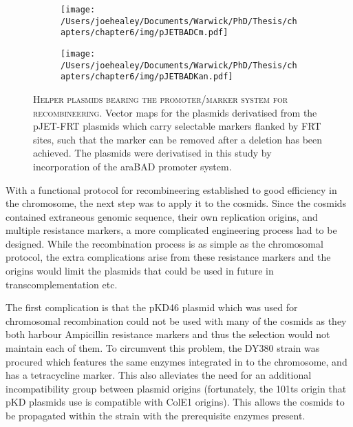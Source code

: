 \begin{figure}[p]
\centering
  \begin{subfigure}{\textwidth}
    \texttt{[image: /Users/joehealey/Documents/Warwick/PhD/Thesis/chapters/chapter6/img/pJETBADCm.pdf]}
    \captionsetup{singlelinecheck=off, justification=centering, font=footnotesize, aboveskip=10pt}
  \end{subfigure}
  
  \begin{subfigure}{\textwidth}
    \texttt{[image: /Users/joehealey/Documents/Warwick/PhD/Thesis/chapters/chapter6/img/pJETBADKan.pdf]}
    \captionsetup{singlelinecheck=off, justification=centering, font=footnotesize, aboveskip=10pt}
  \end{subfigure}
    
    \captionsetup{singlelinecheck=off, justification=justified, font=footnotesize, aboveskip=10pt}
    \caption[Cosmid recombineering helper plasmids created]{\textsc{\normalsize Helper plasmids bearing the promoter/marker system for recombineering.} \vspace{0.1cm} \newline Vector maps for the plasmids derivatised from the pJET-FRT plasmids which carry selectable markers flanked by FRT sites, such that the marker can be removed after a deletion has been achieved. The plasmids were derivatised in this study by incorporation of the araBAD promoter system.}
\label{helpermaps}
\end{figure}


With a functional protocol for recombineering established to good efficiency in the chromosome, the next step was to apply it to the cosmids. Since the cosmids contained extraneous genomic sequence, their own replication origins, and multiple resistance markers, a more complicated engineering process had to be designed. While the recombination process is as simple as the chromosomal protocol, the extra complications arise from these resistance markers and the origins would limit the plasmids that could be used in future in transcomplementation etc.

The first complication is that the pKD46 plasmid which was used for chromosomal recombination could not be used with many of the cosmids as they both harbour Ampicillin resistance markers and thus the selection would not maintain each of them. To circumvent this problem, the DY380 strain was procured which features the same enzymes integrated in to the chromosome, and has a tetracycline marker. This also alleviates the need for an additional incompatibility group between plasmid origins (fortunately, the 101ts origin that pKD plasmids use is compatible with ColE1 origins). This allows the cosmids to be propagated within the strain with the prerequisite enzymes present.

